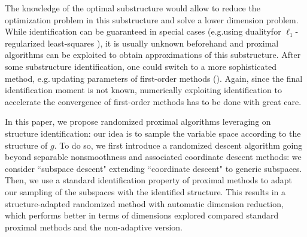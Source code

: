 The knowledge of the optimal substructure would allow to reduce the optimization problem in this substructure and solve a lower dimension problem. While identification can be guaranteed in special cases  (e.g.\;using duality\;for $\ell_1$-regularized least-squares \cite{ogawa2013safe, fercoq2015mind}), 
it is usually unknown beforehand and proximal algorithms can be exploited to obtain approximations of this substructure.
%  
After some substructure identification, one could switch to a more sophisticated method, e.g.\,updating parameters of first-order methods (\cite{2015-Liang-InterialFB}).
Again, since the final identification moment is not known, numerically exploiting identification to accelerate the convergence of first-order methods has to be done with great care.



In this paper, we propose randomized proximal algorithms leveraging on structure identification: our idea is to sample the variable space according to the structure of $g$. To do so, we first introduce a randomized descent algorithm going beyond separable nonsmoothness and associated coordinate descent methods:
we consider ``subspace descent" extending ``coordinate descent" to generic subspaces.
Then, we use a standard identification property of proximal methods to adapt our sampling of the subspaces with the identified structure. This results in a structure-adapted randomized method with automatic dimension reduction, which 
performs better in terms of dimensions explored compared standard proximal methods and the non-adaptive version.

